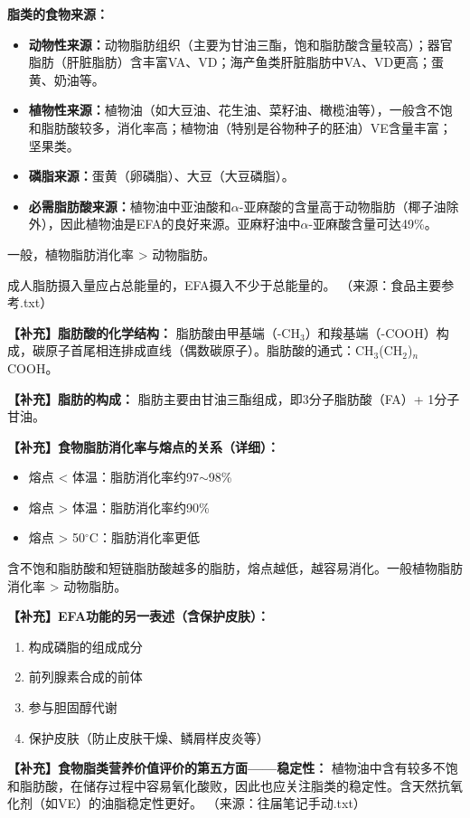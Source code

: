 \begin{tipbox}
\textbf{脂类的食物来源：}
\begin{itemize}[leftmargin=*]
    \item \textbf{动物性来源：}动物脂肪组织（主要为甘油三酯，饱和脂肪酸含量较高）；器官脂肪（肝脏脂肪）含丰富VA、VD；海产鱼类肝脏脂肪中VA、VD更高；蛋黄、奶油等。
    \item \textbf{植物性来源：}植物油（如大豆油、花生油、菜籽油、橄榄油等），一般含不饱和脂肪酸较多，消化率高；植物油（特别是谷物种子的胚油）VE含量丰富；坚果类。
    \item \textbf{磷脂来源：}蛋黄（卵磷脂）、大豆（大豆磷脂）。
    \item \textbf{必需脂肪酸来源：}植物油中亚油酸和$\alpha$-亚麻酸的含量高于动物脂肪（椰子油除外），因此植物油是EFA的良好来源。亚麻籽油中$\alpha$-亚麻酸含量可达49\%。
\end{itemize}

一般，植物脂肪消化率 > 动物脂肪。

成人脂肪摄入量应占总能量的，EFA摄入不少于总能量的。
（来源：食品主要参考.txt）
\end{tipbox}

\begin{tipbox}
\textbf{【补充】脂肪酸的化学结构：}
脂肪酸由甲基端（-CH$_3$）和羧基端（-COOH）构成，碳原子首尾相连排成直线（偶数碳原子）。脂肪酸的通式：CH$_3$(CH$_2$)$_n$COOH。

\textbf{【补充】脂肪的构成：}
脂肪主要由甘油三酯组成，即3分子脂肪酸（FA）+ 1分子甘油。

\textbf{【补充】食物脂肪消化率与熔点的关系（详细）：}
\begin{itemize}[leftmargin=*]
    \item 熔点 < 体温：脂肪消化率约97$\sim$98\%
    \item 熔点 > 体温：脂肪消化率约90\%
    \item 熔点 > 50$^\circ$C：脂肪消化率更低
\end{itemize}
含不饱和脂肪酸和短链脂肪酸越多的脂肪，熔点越低，越容易消化。一般植物脂肪消化率 > 动物脂肪。

\textbf{【补充】EFA功能的另一表述（含保护皮肤）：}
\begin{enumerate}[leftmargin=*]
    \item 构成磷脂的组成成分
    \item 前列腺素合成的前体
    \item 参与胆固醇代谢
    \item 保护皮肤（防止皮肤干燥、鳞屑样皮炎等）
\end{enumerate}

\textbf{【补充】食物脂类营养价值评价的第五方面——稳定性：}
植物油中含有较多不饱和脂肪酸，在储存过程中容易氧化酸败，因此也应关注脂类的稳定性。含天然抗氧化剂（如VE）的油脂稳定性更好。
（来源：往届笔记手动.txt）
\end{tipbox}

